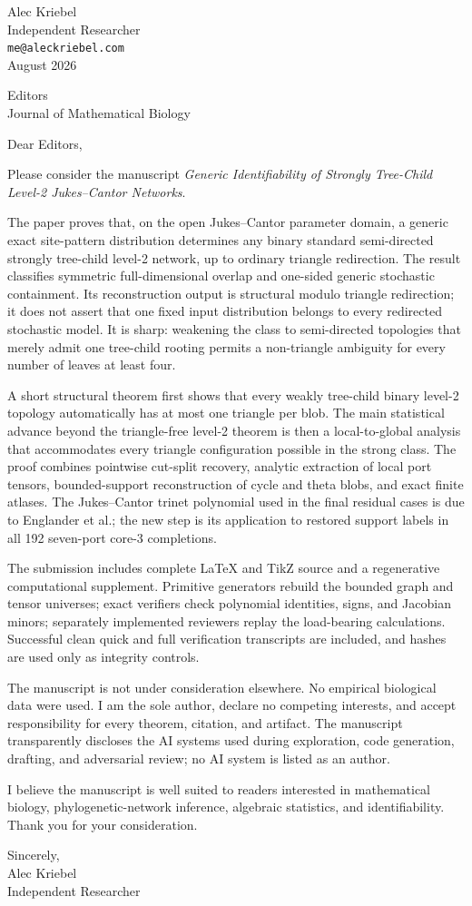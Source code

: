 \documentclass[10pt]{article}
\newcommand{\TargetJournal}{Journal of Mathematical Biology}
\begin{document}
\begin{flushright}
Alec Kriebel\\Independent Researcher\\\texttt{me@aleckriebel.com}\\[4pt]August 2026
\end{flushright}
Editors\\\TargetJournal

Dear Editors,

Please consider the manuscript \emph{Generic Identifiability of Strongly Tree-Child Level-2 Jukes--Cantor Networks}.

The paper proves that, on the open Jukes--Cantor parameter domain, a generic exact site-pattern distribution determines any binary standard semi-directed strongly tree-child level-2 network, up to ordinary triangle redirection.  The result classifies symmetric full-dimensional overlap and one-sided generic stochastic containment.  Its reconstruction output is structural modulo triangle redirection; it does not assert that one fixed input distribution belongs to every redirected stochastic model.  It is sharp: weakening the class to semi-directed topologies that merely admit one tree-child rooting permits a non-triangle ambiguity for every number of leaves at least four.

A short structural theorem first shows that every weakly tree-child binary level-2 topology automatically has at most one triangle per blob.  The main statistical advance beyond the triangle-free level-2 theorem is then a local-to-global analysis that accommodates every triangle configuration possible in the strong class.  The proof combines pointwise cut-split recovery, analytic extraction of local port tensors, bounded-support reconstruction of cycle and theta blobs, and exact finite atlases.  The Jukes--Cantor trinet polynomial used in the final residual cases is due to Englander et al.; the new step is its application to restored support labels in all 192 seven-port core-3 completions.

The submission includes complete LaTeX and TikZ source and a regenerative computational supplement.  Primitive generators rebuild the bounded graph and tensor universes; exact verifiers check polynomial identities, signs, and Jacobian minors; separately implemented reviewers replay the load-bearing calculations.  Successful clean quick and full verification transcripts are included, and hashes are used only as integrity controls.

The manuscript is not under consideration elsewhere.  No empirical biological data were used.  I am the sole author, declare no competing interests, and accept responsibility for every theorem, citation, and artifact.  The manuscript transparently discloses the AI systems used during exploration, code generation, drafting, and adversarial review; no AI system is listed as an author.

I believe the manuscript is well suited to readers interested in mathematical biology, phylogenetic-network inference, algebraic statistics, and identifiability.  Thank you for your consideration.

Sincerely,\\[12pt]
Alec Kriebel\\Independent Researcher
\end{document}
